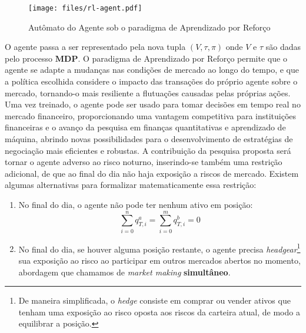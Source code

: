 \begin{figure}[H]
	\centering
	\texttt{[image: files/rl-agent.pdf]}
	\caption{Autômato do Agente sob o paradigma de Aprendizado por Reforço}
	\label{fig:rl-agent}
\end{figure}

O agente passa a ser representado pela nova tupla $(V, \tau, \pi)$ onde $V$ e $\tau$ são dadas pelo processo $\mathbf{MDP}$. O paradigma de Aprendizado por Reforço permite que o agente se adapte a mudanças nas condições de mercado ao longo do tempo, e que a política escolhida considere o impacto das transações do próprio agente sobre o mercado, tornando-o mais resiliente a flutuações causadas pelas próprias ações. Uma vez treinado, o agente pode ser usado para tomar decisões em tempo real no mercado financeiro, proporcionando uma vantagem competitiva para instituições financeiras e o avanço da pesquisa em finanças quantitativas e aprendizado de máquina, abrindo novas possibilidades para o desenvolvimento de estratégias de negociação mais eficientes e robustas. A contribuição da pesquisa proposta será tornar o agente adverso ao risco noturno, inserindo-se também uma restrição adicional, de que ao final do dia não haja exposição a riscos de mercado. 
Existem algumas alternativas para formalizar matematicamente essa restrição:
\begin{enumerate}
    \item No final do dia, o agente não pode ter nenhum ativo em posição: 
    \begin{equation} \label{overnight_restriction}
        \sum_{i = 0}^{n} q_{T, i}^{a}  = \sum_{i=0}^{m} q_{T, i}^{b} = 0
    \end{equation}
    \item No final do dia, se houver alguma posição restante, o agente precisa \textit{headgear}\footnote{De maneira simplificada, o \textit{hedge} consiste em comprar ou vender ativos que tenham uma exposição ao risco oposta aos riscos da carteira atual, de modo a equilibrar a posição.} sua exposição ao risco ao participar em outros mercados abertos no momento, abordagem que chamamos de \textit{market making} \textbf{simultâneo}.
\end{enumerate}
